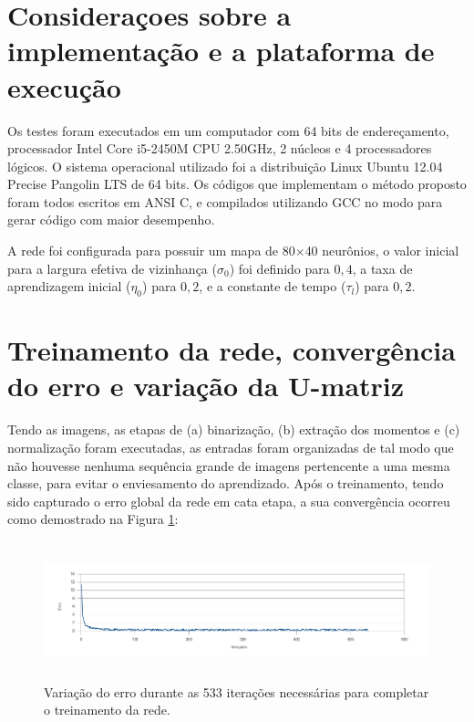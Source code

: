 \section{Consideraçoes sobre a implementação e a plataforma de execução}

Os testes foram executados em um computador com 64 bits de endereçamento,
processador Intel Core i5-2450M CPU 2.50GHz, 2 núcleos e 4 processadores
lógicos. O sistema operacional utilizado foi a distribuição Linux Ubuntu 12.04
Precise Pangolin LTS de 64 bits. Os códigos que implementam o método proposto
foram todos escritos em ANSI C, e compilados utilizando GCC no modo para gerar
código com maior desempenho.

A rede foi configurada para possuir um mapa de 80$ \times $40 neurônios, o valor
inicial para a largura efetiva de vizinhança ($ \sigma_0 $) foi definido para
$ 0,4 $, a taxa de aprendizagem inicial ($ \eta_0 $) para $ 0,2 $,
e a constante de tempo ($ \tau_l $) para $ 0,2 $.

\section{Treinamento da rede, convergência do erro e variação da U-matriz}

Tendo as imagens, as etapas de (a) binarização, (b) extração dos momentos e (c)
normalização foram executadas, as entradas foram organizadas de tal modo que
não houvesse nenhuma sequência grande de imagens pertencente a uma mesma classe,
para evitar o enviesamento do aprendizado. Após o treinamento, tendo sido
capturado o erro global da rede em cata etapa, a sua convergência ocorreu
como demostrado na Figura \ref{fig:error}:

\begin{figure}[H]
  \begin{center}
    \includegraphics[height=4cm]{imagens/error.pdf}
  \end{center}
  \caption{ Variação do erro durante as 533 iterações necessárias para completar
    o treinamento da rede.}
  \label{fig:error}
\end{figure}

